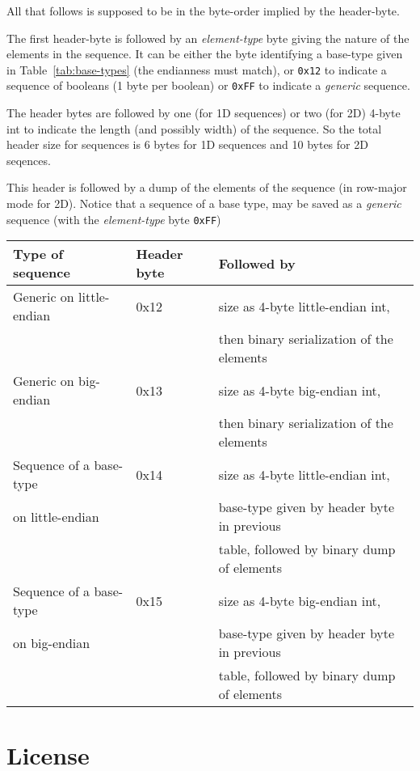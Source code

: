 \documentclass[11pt]{book}
\begin{document}
{All that follows is supposed to be in the byte-order implied by the header-byte.

The first header-byte is followed by an {\em element-type} byte giving the nature
of the elements in the sequence.  It can be either the byte identifying a
base-type given in Table~\ref{tab:base-types} (the endianness must match),
or {\tt 0x12} to indicate a sequence of booleans (1 byte per boolean) 
or {\tt 0xFF} to indicate a {\em generic} sequence.

The header bytes are followed by one (for 1D sequences) or two (for 2D)
4-byte int to indicate the length (and possibly width) of the sequence.
So the total header size for sequences is 6 bytes for 1D sequences and 10
bytes for 2D seqences.

This header is followed by a dump of the elements of the sequence (in
row-major mode for 2D).  Notice that a sequence of a base type, may be
saved as a {\em generic} sequence (with the {\em element-type} byte {\tt 0xFF})


\begin{tabular}{|l|l|l|} \hline
Type of sequence         & Header byte & Followed by \\ \hline
Generic on little-endian & 0x12        & size as 4-byte little-endian int, \\
                         &             & then binary serialization of the elements \\ \hline
Generic on big-endian    & 0x13        & size as 4-byte big-endian int, \\ 
                         &             & then binary serialization of the elements \\ \hline
Sequence of a base-type  & 0x14        & size as 4-byte little-endian int, \\ 
on little-endian         &             & base-type given by header byte in previous \\
                         &             & table, followed by binary dump of elements \\ \hline
Sequence of a base-type  & 0x15        & size as 4-byte big-endian int, \\ 
on big-endian            &             & base-type given by header byte in previous \\
                         &             & table, followed by binary dump of elements \\ \hline
\end{tabular}


\chapter*{License}

}
\end{document}
